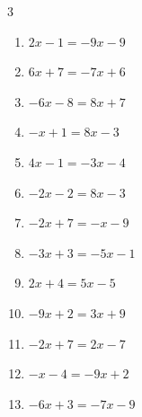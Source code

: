 \begin{multicols}{3}
\begin{enumerate}

  \item $2x-1=-9x-9$


  \item $6x+7=-7x+6$


  \item $-6x-8=8x+7$


  \item $-x+1=8x-3$


  \item $4x-1=-3x-4$


  \item $-2x-2=8x-3$


  \item $-2x+7=-x-9$

        \phantom{$\displaystyle x=16$}

  \item $-3x+3=-5x-1$

        \phantom{$\displaystyle x=-2$}

  \item $2x+4=5x-5$

        \phantom{$\displaystyle x=3$}

  \item $-9x+2=3x+9$


  \item $-2x+7=2x-7$


  \item $-x-4=-9x+2$


\columnbreak %

\resetques

  \item $-6x+3=-7x-9$

        \phantom{$\displaystyle x=-12$}


\end{enumerate}
\end{multicols}
